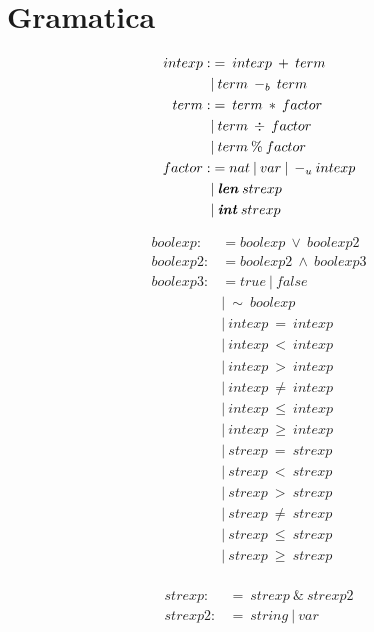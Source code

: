 \documentclass{article}
\begin{document}
    \section{Gramatica}
\begin{align*}
    intexp :&= \: intexp \: + \: term \\
    &| \: term \: -_{b} \: term \\
    term :&= \: term \: * \: factor \\
    &| \: term \: \div \: factor \\
    &| \: term \: \% \: factor \\
    factor :&= nat \: | \: var \: | \: -_{u}intexp\\
    &| \: \textbf{\textit{len}} \: strexp \\
    &| \: \textbf{\textit{int}} \: strexp \\
\end{align*}

\begin{align*}
    boolexp :&= boolexp \: \vee \: boolexp2 \\
    boolexp2 :&= boolexp2 \: \wedge \: boolexp3 \\
    boolexp3 :&= true \: | \: false \\
    &| \: \sim \: boolexp \\
    &| \: intexp \: = \: intexp \\
    &| \: intexp \: < \: intexp \\
    &| \: intexp \: > \: intexp \\
    &| \: intexp \: \ne \: intexp \\
    &| \: intexp \: \leq \: intexp \\
    &| \: intexp \: \geq \: intexp \\
    &| \: strexp \: = \: strexp \\
    &| \: strexp \: < \: strexp \\
    &| \: strexp \: > \: strexp \\
    &| \: strexp \: \ne \: strexp \\
    &| \: strexp \: \leq \: strexp \\
    &| \: strexp \: \geq \: strexp \\
\end{align*}

\begin{align*}
    strexp :&= \: strexp \: \& \: strexp2 \\
    strexp2 :&= \: string \: | \: var \\
\end{align*}
\end{document}
